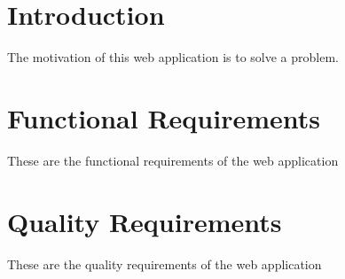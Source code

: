 \documentclass[onecolumn,journal,12pt]{article}
\begin{document}
\maketitle

\section*{Introduction} %
The motivation of this web application is to solve a problem. 

\section*{Functional Requirements}
These are the functional requirements of the web application

\section*{Quality Requirements}
These are the quality requirements of the web application
\end{document}
